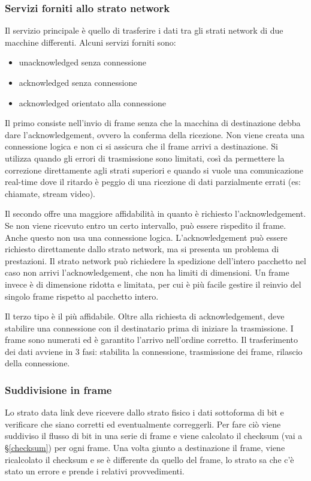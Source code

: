\subsubsection{Servizi forniti allo strato network}
Il servizio principale è quello di trasferire i dati tra gli strati network di due macchine differenti.
Alcuni servizi forniti sono:
\begin{itemize}
    \item unacknowledged senza connessione
    \item acknowledged senza connessione
    \item acknowledged orientato alla connessione
\end{itemize}
Il primo consiste nell'invio di frame senza che la macchina di destinazione debba dare l'acknowledgement, ovvero la conferma della ricezione.
Non viene creata una connessione logica e non ci si assicura che il frame arrivi a destinazione.
Si utilizza quando gli errori di trasmissione sono limitati, così da permettere la correzione direttamente agli strati superiori e
quando si vuole una comunicazione real-time dove il ritardo è peggio di una ricezione di dati parzialmente errati (es: chiamate, stream video).

Il secondo offre una maggiore affidabilità in quanto è richiesto l'acknowledgement.
Se non viene ricevuto entro un certo intervallo, può essere rispedito il frame. 
Anche questo non usa una connessione logica. 
L'acknowledgement può essere richiesto direttamente dallo strato network, ma si presenta un problema di prestazioni.
Il strato network può richiedere la spedizione dell'intero pacchetto nel caso non arrivi l'acknowledgement, che non ha limiti di dimensioni.
Un frame invece è di dimensione ridotta e limitata, per cui è più facile gestire il reinvio del singolo frame rispetto al pacchetto intero.

Il terzo tipo è il più affidabile. Oltre alla richiesta di acknowledgement, deve stabilire una connessione con il destinatario prima di iniziare la trasmissione.
I frame sono numerati ed è garantito l'arrivo nell'ordine corretto.
Il trasferimento dei dati avviene in 3 fasi: stabilita la connessione, trasmissione dei frame, rilascio della connessione. 

\subsubsection{Suddivisione in frame}
Lo strato data link deve ricevere dallo strato fisico i dati sottoforma di bit e verificare che siano corretti ed eventualmente correggerli.
Per fare ciò viene suddiviso il flusso di bit in una serie di frame e viene calcolato il checksum (vai a §\ref{checksum}) per ogni frame.
Una volta giunto a destinazione il frame, viene ricalcolato il checksum e se è differente da quello del frame, lo strato sa che c'è stato un errore e prende i relativi provvedimenti.

